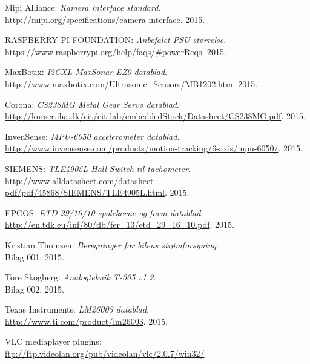 \renewcommand{\bibname}{Litteraturliste}
\fancyhead[CE,CO]{}
\fancyfoot[CE,CO]{}
\begin{thebibliography}{2}


 Mipi Alliance: \textit{Kamera interface standard}. \\ 
\url{http://mipi.org/specifications/camera-interface}. 2015.

 RASPBERRY PI FOUNDATION: \textit{Anbefalet PSU størrelse}. \\
\url{https://www.raspberrypi.org/help/faqs/#powerReqs}. 2015.

 MaxBotix: \textit{I2CXL-MaxSonar-EZ0 datablad}. \\
\url{http://www.maxbotix.com/Ultrasonic_Sensors/MB1202.htm}. 2015.

 Corona: \textit{CS238MG Metal Gear Servo datablad}. \\
\url{http://kurser.iha.dk/eit/eit-lab/embeddedStock/Datasheet/CS238MG.pdf}. 2015.

 InvenSense: \textit{MPU-6050 accelerometer datablad}. \\
\url{http://www.invensense.com/products/motion-tracking/6-axis/mpu-6050/}. 2015.

 SIEMENS: \textit{TLE4905L Hall Switch til tachometer}. \\
\url{http://www.alldatasheet.com/datasheet-pdf/pdf/45868/SIEMENS/TLE4905L.html}. 2015.

 EPCOS: \textit{ETD 29/16/10 spolekerne og form datablad}. \\
\url{http://en.tdk.eu/inf/80/db/fer_13/etd_29_16_10.pdf}. 2015.

 Kristian Thomsen: \textit{Beregninger for bilens strømforsyning}. \\
Bilag 001. 2015.

 Tore Skogberg: \textit{Analogteknik T-005 v1.2}.\\
Bilag 002. 2015.

 Texas Instruments: \textit{LM26003 datablad}. \\
\url{http://www.ti.com/product/lm26003}. 2015.

 VLC mediaplayer plugins: \\
\url{ftp://ftp.videolan.org/pub/videolan/vlc/2.0.7/win32/}


\end{thebibliography}
